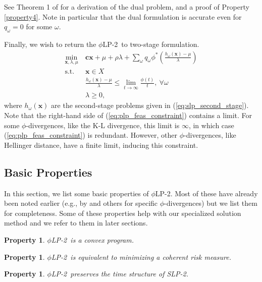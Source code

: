 \documentclass[ijoc,letterpaper]{informs3} %
\newcommand{\x}{\mathbf{x}}
\renewcommand{\c}{\mathbf{c}}
\newtheorem{property}[theorem]{Property}
\newcommand{\st}{\mbox{s.t.}}
\newcommand{\plp}{$\phi$LP-2}
\begin{document}
See Theorem 1 of \cite{bental2011robust} for a derivation of the dual problem, and a proof of Property \ref{property4}.
Note in particular that the dual formulation is accurate even for $q_\omega = 0$ for some $\omega$.

Finally, we wish to return the \plp\ to two-stage formulation.
\begin{align}
	\min_{\x,\lambda,\mu} \ & \c\x + \mu + \rho \lambda + \sum_\omega q_\omega \phi^*\left(\frac{h_\omega(\x) - \mu}{\lambda}\right) \label{eq:plp_two_stage} \\
	\st \ & \x \in X \nonumber \\
	& \frac{h_\omega(\x) - \mu}{\lambda} \leq \lim_{t \rightarrow \infty} \frac{\phi(t)}{t}, \ \forall \omega \label{eq:plp_feas_constraint}\\
	& \lambda \geq 0, \nonumber
\end{align}
where $h_\omega(\x)$ are the second-stage problems given in (\ref{eq:slp_second_stage}).
Note that the right-hand side of (\ref{eq:plp_feas_constraint}) contains a limit.
For some $\phi$-divergences, like the K-L divergence, this limit is $\infty$, in which case (\ref{eq:plp_feas_constraint}) is redundant.
However, other $\phi$-divergences, like Hellinger distance, have a finite limit, inducing this constraint.

\subsection{Basic Properties}
\label{ssec:basicprop}

In this section, we list some basic properties of \plp.
Most of these have already been noted earlier (e.g., by \cite{bental2011robust} and others for specific $\phi$-divergences) but we list them for completeness. Some of these properties help with our specialized solution method and we refer to them in later sections.

\begin{property}\label{property1}
	\plp\ is a convex program.
\end{property}

\begin{property}\label{property2}
	\label{prop:coherent_risk_measure}
	\plp\ is equivalent to minimizing a coherent risk measure.
\end{property}

\begin{property}\label{property3}
	\plp\ preserves the time structure of SLP-2.
\end{property}
\end{document}
